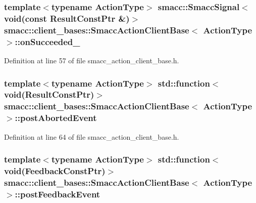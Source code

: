 \subsubsection[{\texorpdfstring{on\+Succeeded\+\_\+}{onSucceeded_}}]{\setlength{\rightskip}{0pt plus 5cm}template$<$typename Action\+Type$>$ {\bf smacc\+::\+Smacc\+Signal}$<$void(const Result\+Const\+Ptr \&)$>$ {\bf smacc\+::client\+\_\+bases\+::\+Smacc\+Action\+Client\+Base}$<$ Action\+Type $>$\+::on\+Succeeded\+\_\+}\hypertarget{classsmacc_1_1client__bases_1_1SmaccActionClientBase_afa1d615e16c9e825d815a3a3ccaa61df}{}\label{classsmacc_1_1client__bases_1_1SmaccActionClientBase_afa1d615e16c9e825d815a3a3ccaa61df}


Definition at line 57 of file smacc\+\_\+action\+\_\+client\+\_\+base.\+h.

\subsubsection[{\texorpdfstring{post\+Aborted\+Event}{postAbortedEvent}}]{\setlength{\rightskip}{0pt plus 5cm}template$<$typename Action\+Type$>$ std\+::function$<$void(Result\+Const\+Ptr)$>$ {\bf smacc\+::client\+\_\+bases\+::\+Smacc\+Action\+Client\+Base}$<$ Action\+Type $>$\+::post\+Aborted\+Event}\hypertarget{classsmacc_1_1client__bases_1_1SmaccActionClientBase_a9ca2952ededeec233ee6d8a9a39c680b}{}\label{classsmacc_1_1client__bases_1_1SmaccActionClientBase_a9ca2952ededeec233ee6d8a9a39c680b}


Definition at line 64 of file smacc\+\_\+action\+\_\+client\+\_\+base.\+h.

\subsubsection[{\texorpdfstring{post\+Feedback\+Event}{postFeedbackEvent}}]{\setlength{\rightskip}{0pt plus 5cm}template$<$typename Action\+Type$>$ std\+::function$<$void(Feedback\+Const\+Ptr)$>$ {\bf smacc\+::client\+\_\+bases\+::\+Smacc\+Action\+Client\+Base}$<$ Action\+Type $>$\+::post\+Feedback\+Event}\hypertarget{classsmacc_1_1client__bases_1_1SmaccActionClientBase_ac754fb0adfc982fe1adde0d92842a33b}{}\label{classsmacc_1_1client__bases_1_1SmaccActionClientBase_ac754fb0adfc982fe1adde0d92842a33b}



